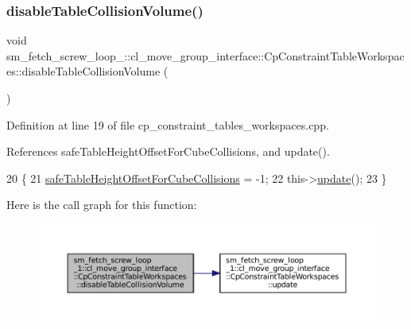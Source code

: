 \subsubsection{\texorpdfstring{disable\+Table\+Collision\+Volume()}{disableTableCollisionVolume()}}
{\footnotesize\ttfamily void sm\+\_\+fetch\+\_\+screw\+\_\+loop\+\_\+::cl\+\_\+move\+\_\+group\+\_\+interface\+::\+Cp\+Constraint\+Table\+Workspaces\+::disable\+Table\+Collision\+Volume (\begin{DoxyParamCaption}{ }\end{DoxyParamCaption})}



Definition at line 19 of file cp\+\_\+constraint\+\_\+tables\+\_\+workspaces.\+cpp.



References safe\+Table\+Height\+Offset\+For\+Cube\+Collisions, and update().


\begin{DoxyCode}
20         \{
21             \hyperlink{classsm__fetch__screw__loop__1_1_1cl__move__group__interface_1_1CpConstraintTableWorkspaces_a63eb3865595f71235002363b5df6c4a0}{safeTableHeightOffsetForCubeCollisions} = -1;
22             this->\hyperlink{classsm__fetch__screw__loop__1_1_1cl__move__group__interface_1_1CpConstraintTableWorkspaces_a24fc1c2ba2d6f09df2cca9bf0c3d3b20}{update}();
23         \}
\end{DoxyCode}
Here is the call graph for this function\+:
\nopagebreak
\begin{figure}[H]
\begin{center}
\leavevmode
\includegraphics[width=350pt]{classsm__fetch__screw__loop__1_1_1cl__move__group__interface_1_1CpConstraintTableWorkspaces_ad3923e3b459840a1cd0ff9f43821fecf_cgraph}
\end{center}
\end{figure}
\mbox{\label{classsm__fetch__screw__loop__1_1_1cl__move__group__interface_1_1CpConstraintTableWorkspaces_a813b53264563225547f31651fd5b3f76}} 

